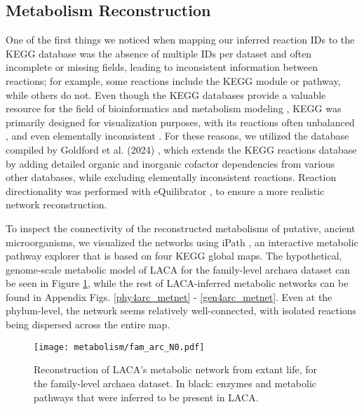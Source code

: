 \subsection*{Metabolism Reconstruction}


One of the first things we noticed when mapping our inferred reaction IDs to the KEGG database was the absence of multiple IDs per dataset and often incomplete or missing fields, leading to inconsistent information between reactions; for example, some reactions include the KEGG module or pathway, while others do not. Even though the KEGG databases provide a valuable resource for the field of bioinformatics and metabolism modeling \cite{kanehisa2000}, KEGG was primarily designed for visualization purposes, with its reactions often unbalanced \cite{wrzodek2013}, and even elementally inconsistent \cite{goldford2024}. For these reasons, we utilized the database compiled by Goldford et al. (2024) \cite{goldford2024}, which extends the KEGG reactions database by adding detailed organic and inorganic cofactor dependencies from various other databases, while excluding elementally inconsistent reactions. Reaction directionality was performed with eQuilibrator \cite{beber2022}, to ensure a more realistic network reconstruction.

To inspect the connectivity of the reconstructed metabolisms of putative, ancient microorganisms, we visualized the networks using iPath \cite{darzi2018}, an interactive metabolic pathway explorer that is based on four KEGG global maps. The hypothetical, genome-scale metabolic model of LACA for the family-level archaea dataset can be seen in Figure \ref{fam4arc_metnet}, while the rest of LACA-inferred metabolic networks can be found in Appendix Figs. \ref{phy4arc_metnet} - \ref{gen4arc_metnet}. Even at the phylum-level, the network seems relatively well-connected, with isolated reactions being dispersed across the entire map.

\begin{figure}[H]
    \centering
    \texttt{[image: metabolism/fam\_arc\_N0.pdf]}
    \caption{Reconstruction of LACA's metabolic network from extant life, for the family-level archaea dataset. In black: enzymes and metabolic pathways that were inferred to be present in LACA.}    
    \label{fam4arc_metnet}
\end{figure}


